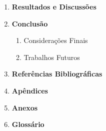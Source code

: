 \documentclass[12pt,oneside,a4paper,brazil]{article}
\begin{document}
\begin{enumerate}
		\item \textbf{Resultados e Discussões}
		
		
		\item \textbf{Conclusão}
		\begin{enumerate}
			\item Considerações Finais
			\item Trabalhos Futuros
		\end{enumerate}
		
		\item \textbf{Referências Bibliográficas}
		\item \textbf{Apêndices}
		\item \textbf{Anexos}
		\item \textbf{Glossário}
	\end{enumerate}
\end{document}
